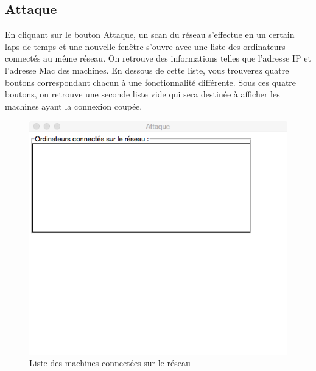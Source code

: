 \documentclass[11pt]{article}
\begin{document}
\subsection{Attaque}
En cliquant sur le bouton Attaque, un scan du réseau s'effectue en un certain laps de temps et une nouvelle fenêtre s'ouvre avec une liste des ordinateurs connectés au même réseau. On retrouve des informations telles que l'adresse IP et l'adresse Mac des machines. En dessous de cette liste, vous trouverez quatre boutons  correspondant chacun à une fonctionnalité différente. Sous ces quatre boutons, on retrouve une seconde liste vide qui sera destinée à afficher les machines ayant la connexion coupée.
\begin{figure}[!h]
\centering
\includegraphics[scale=0.6]{./Captures/fausseFenetre.png}
\caption{Liste des machines connectées sur le réseau}
\end{figure}
\end{document}
